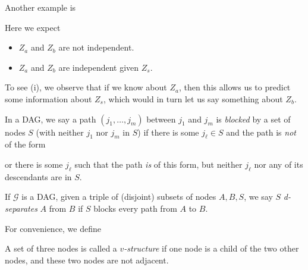 \documentclass[a4paper]{article}
\begin{document}
Another example is
\begin{center}
\end{center}
Here we expect
\begin{itemize}
  \item $Z_a$ and $Z_b$ are not independent.
  \item $Z_a$ and $Z_b$ are independent given $Z_s$.
\end{itemize}
To see (i), we observe that if we know about $Z_a$, then this allows us to predict some information about $Z_s$, which would in turn let us say something about $Z_b$.
\begin{defi}[Blocked]
  In a DAG, we say a path $(j_1, \ldots, j_m)$ between $j_1$ and $j_m$ is \emph{blocked} by a set of nodes $S$ (with neither $j_1$ nor $j_m$ in $S$) if there is some $j_\ell \in S$ and the path is \emph{not} of the form
  \begin{center}
  \end{center}
  or there is some $j_\ell$ such that the path \emph{is} of this form, but neither $j_\ell$ nor any of its descendants are in $S$.
\end{defi}

\begin{defi}[d-separate]
  If $\mathcal{G}$ is a DAG, given a triple of (disjoint) subsets of nodes $A, B, S$, we say $S$ \emph{d-separates} $A$ from $B$ if $S$ blocks every path from $A$ to $B$.
\end{defi}

For convenience, we define
\begin{defi}[$v$-structure]
  A set of three nodes is called a \emph{$v$-structure} if one node is a child of the two other nodes, and these two nodes are not adjacent.
\end{defi}
\end{document}

